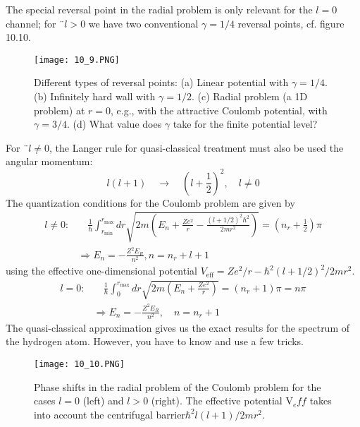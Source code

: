 The special reversal point in the radial problem is only relevant for the $l = 0$ channel; for $¨ l> 0$ we have two conventional $\gamma = 1/4$ reversal points, cf. figure 10.10.\par
\begin{figure}[ht]
        \centering
        \texttt{[image: 10\_9.PNG]}
        \caption{Different types of reversal points: (a) Linear potential with $\gamma = 1/4$. (b) Infinitely hard wall with $\gamma = 1/2$. (c) Radial problem (a 1D problem) at $r = 0$, e.g., with the attractive Coulomb potential, with $\gamma = 3/4$. (d) What value does $\gamma$ take for the finite potential level?}
\end{figure}
For $¨ l \neq 0$, the Langer rule for quasi-classical treatment must also be used
the angular momentum:
\begin{equation}
    l(l+1) \quad \rightarrow \quad\left(l+\frac{1}{2}\right)^{2}, \quad l \neq 0
    \end{equation}
The quantization conditions for the Coulomb problem are given by
$$
\begin{aligned} l \neq 0: & \quad\frac{1}{\hbar} \int_{r_{\min }}^{r_{\max }} d r \sqrt{2 m\left(E_{n}+\frac{Z e^{2}}{r}-\frac{(l+1 / 2)^{2} \hbar^{2}}{2 m r^{2}}\right)}=\left(n_{r}+\frac{1}{2}\right) \pi \\ &\Rightarrow E_{n}=-\frac{Z^{2} E_{R}}{n^{2}}, n=n_{r}+l+1 \end{aligned}
$$
using the effective one-dimensional potential $V_{\text{eff}}=Ze^2/r-\hbar^2(l+1/2)^2/2mr^2$.
$$
\begin{aligned} l=0: &\quad \frac{1}{\hbar} \int_{0}^{r_{\max }} d r \sqrt{2 m\left(E_{n}+\frac{Z e^{2}}{r}\right)}=\left(n_{r}+1\right) \pi=n \pi \\ & \Rightarrow E_{n}=-\frac{Z^{2} E_{R}}{n^{2}}, \quad n=n_{r}+1 \end{aligned}
$$
The quasi-classical approximation gives us the exact results for the spectrum of the hydrogen atom. However, you have to know and use a few tricks.
\begin{figure}[ht]
        \centering
        \texttt{[image: 10\_10.PNG]}
        \caption{Phase shifts in the radial problem of the Coulomb problem for the cases $l = 0$ (left) and $l> 0$ (right). The effective potential $\text{V}_eff$ takes into account the centrifugal barrier$ \hbar^2l (l + 1) / 2mr^2$.}
\end{figure}

